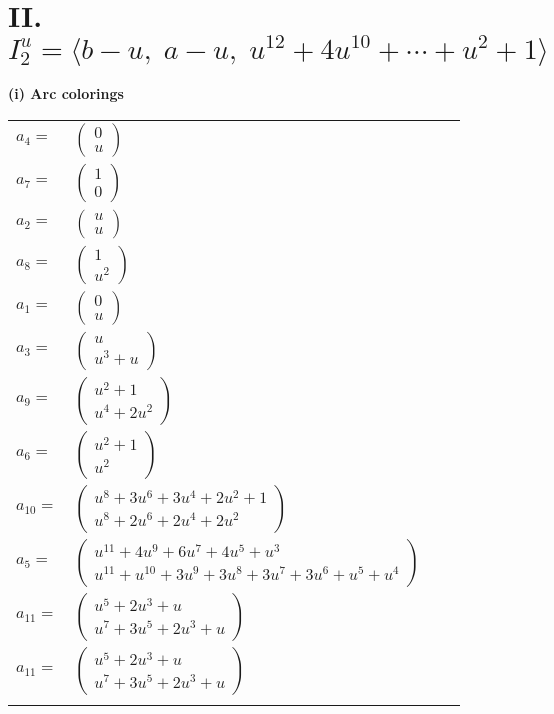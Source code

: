 \documentclass[1p]{elsarticle_modified}
\theoremstyle{definition}
\begin{document}
\centering \section*{II. $I^u_{2}= \langle b- u,\;a- u,\;u^{12}+4 u^{10}+\cdots+u^2+1 \rangle$}
\flushleft \textbf{(i) Arc colorings}\\
\begin{tabular}{m{7pt} m{180pt} m{7pt} m{180pt} }
\flushright $a_{4}=$&$\begin{pmatrix}0\\u\end{pmatrix}$ \\
\flushright $a_{7}=$&$\begin{pmatrix}1\\0\end{pmatrix}$ \\
\flushright $a_{2}=$&$\begin{pmatrix}u\\u\end{pmatrix}$ \\
\flushright $a_{8}=$&$\begin{pmatrix}1\\u^2\end{pmatrix}$ \\
\flushright $a_{1}=$&$\begin{pmatrix}0\\u\end{pmatrix}$ \\
\flushright $a_{3}=$&$\begin{pmatrix}u\\u^3+u\end{pmatrix}$ \\
\flushright $a_{9}=$&$\begin{pmatrix}u^2+1\\u^4+2 u^2\end{pmatrix}$ \\
\flushright $a_{6}=$&$\begin{pmatrix}u^2+1\\u^2\end{pmatrix}$ \\
\flushright $a_{10}=$&$\begin{pmatrix}u^8+3 u^6+3 u^4+2 u^2+1\\u^8+2 u^6+2 u^4+2 u^2\end{pmatrix}$ \\
\flushright $a_{5}=$&$\begin{pmatrix}u^{11}+4 u^9+6 u^7+4 u^5+u^3\\u^{11}+u^{10}+3 u^9+3 u^8+3 u^7+3 u^6+u^5+u^4\end{pmatrix}$ \\
\flushright $a_{11}=$&$\begin{pmatrix}u^5+2 u^3+u\\u^7+3 u^5+2 u^3+u\end{pmatrix}$\\ \flushright $a_{11}=$&$\begin{pmatrix}u^5+2 u^3+u\\u^7+3 u^5+2 u^3+u\end{pmatrix}$\\&\end{tabular}
\end{document}
